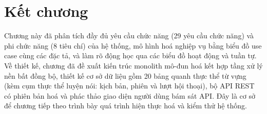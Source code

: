 \section{Kết chương}
\label{sec:ket-chuong-2}

Chương này đã phân tích đầy đủ yêu cầu chức năng (29 yêu cầu chức năng) và phi
chức năng (8 tiêu chí) của hệ thống, mô hình hoá nghiệp vụ bằng biểu đồ use
case cùng các đặc tả, và làm rõ động học qua các biểu đồ hoạt động và tuần
tự. Về thiết kế, chương đã đề xuất kiến trúc monolith mô-đun hoá kết hợp
tầng xử lý nền bất đồng bộ, thiết kế cơ sở dữ liệu gồm 20 bảng quanh thực thể
từ vựng (kèm cụm thực thể luyện nói: kịch bản, phiên và lượt hội thoại), bộ
API REST có phiên bản hoá và phác thảo giao diện người dùng bám sát API. Đây là
cơ sở để chương tiếp theo trình bày quá trình hiện thực hoá và kiểm thử hệ thống.
